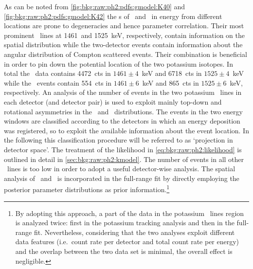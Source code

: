 As can be noted from \cref{fig:bkg:raw:ph2:pdfs:gmodel:K40} and
\cref{fig:bkg:raw:ph2:pdfs:gmodel:K42} the \pdf{}s of \kvn\ and \kvz\ in energy from
different locations are prone to degeneracies and hence parameter correlation. Their most
prominent \g\ lines at 1461~and 1525~keV, respectively, contain information on the spatial
distribution while the two-detector events contain information about the angular
distribution of Compton scattered events. Their combination is beneficial in order to pin
down the potential location of the two potassium isotopes. In total the \Mone\ data
contains 4472~cts in $1461 \pm 4$~keV and 6718~cts in $1525 \pm 4$~keV while the \Mtwo\
events contain 554~cts in $1461 \pm 6$~keV and 865~cts in $1525 \pm 6$~keV, respectively.
An analysis of the number of events in the two potassium \g\ lines in each detector (and
detector pair) is used to exploit mainly top-down and rotational asymmetries in the \kvn\
and \kvz\ distributions. The events in the two energy windows are classified according to
the detectors in which an energy deposition was registered, so to exploit the available
information about the event location. In the following this classification procedure will
be referred to as `projection in detector space'. The treatment of the likelihood
in \cref{eq:bkg:raw:ph2:likelihood} is outlined in detail in
\cref{sec:bkg:raw:ph2:kmodel}.  The number of events in all other \g\ lines is too low in
order to adopt a useful detector-wise analysis. The spatial analysis of \kvn\ and \kvz\ is
incorporated in the full-range fit by directly employing the posterior parameter
distributions as prior information.\footnote{%
  By adopting this approach, a part of the data in the potassium \g\ lines region is
  analyzed twice: first in the potassium tracking analysis and then in the full-range fit.
  Nevertheless, considering that the two analyses exploit different data features
  (i.e.~count rate per detector and total count rate per energy) and the overlap between
  the two data set is minimal, the overall effect is negligible.
}

